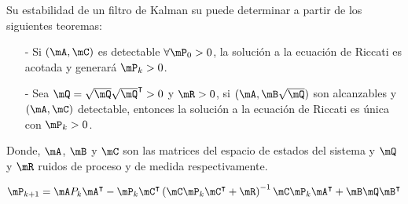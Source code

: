 Su estabilidad de un filtro de Kalman su puede determinar a partir de los siguientes teoremas:
\begin{itemize}
\item[-] Si $(\mA,\mC)$ es detectable $\forall \mP_0>0$, la solución a la ecuación de Riccati es acotada y generará $\mP_k>0$.
\item[-] Sea $\mQ=\sqrt{\mQ}\sqrt{\mQ}^\intercal>0$ y $\mR>0$, si $(\mA,\mB \sqrt{\mQ})$ son alcanzables y $(\mA,\mC)$ detectable, entonces la solución a la ecuación de Riccati es única con $\mP_k>0$.
\end{itemize}
Donde, $\mA$, $\mB$ y $\mC$ son las matrices del espacio de estados del sistema y $\mQ$ y $\mR$ ruidos de proceso y de medida respectivamente.\par

\begin{equation}
\mP_{k+1}=\mA P_k \mA^\intercal-\mP_k\mC^\intercal\left(\mC \mP_k\mC^\intercal+\mR\right)^{-1}\mC\mP_k\mA^\intercal+\mB\mQ\mB^\intercal
\label{riccati}
\end{equation}

